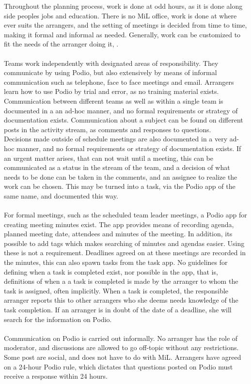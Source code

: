 Throughout the planning process, work is done at odd hours, as it is done along side peoples jobs and education. There is no MiL office, work is done at where ever suits the arrangers, and the setting of meetings is decided from time to time, making it formal and informal as needed. Generally, work can be customized to fit the needs of the arranger doing it, .
\\ \\
Teams work independently with designated areas of responsibility. They communicate by using Podio, but also extensively by means of informal communication such as telephone, face to face meetings and email. Arrangers learn how to use Podio by trial and error, as no training material exists. Communication between different teams as well as within a single team is documented in a an ad-hoc manner, and no formal requirements or strategy of documentation exists. Communication about a subject can be found on different posts in the activity stream, as comments and responses to questions. 
\\
Decisions made outside of schedule meetings are also documented in a very ad-hoc manner, and no formal requirements or strategy of documentation exists. If an urgent matter arises, that can not wait until a meeting, this can be communicated as a status in the stream of the team, and a decision of what needs to be done can be taken in the comments, and an assignee to realize the work can be chosen. This may be turned into a task, via the Podio app of the same name, and documented this way.
\\ \\
For formal meetings, such as the scheduled team leader meetings, a Podio app for creating meeting minutes exist. The app provides means of recording agenda, planned meeting date, attendees and minutes of the meeting. In addition, its possible to add tags which makes searching of minutes and agendas easier. Using these is not a requirement. Deadlines agreed on at these meetings are recorded in the minutes, this can also spawn tasks from the task app. No guidelines for defining when a task is completed exist, nor possible in the app, that is, definitions of when a a task is completed is made by the arranger to whom the task is assigned, often implicitly. When a task is completed, the responsible arranger reports this to other arrangers who she deems needs knowledge of the task completion. If an arranger is in doubt of the date of a deadline, she will search for the information on Podio.
\\ \\
Communication on Podio is carried out informally. No arranger has the role of moderator, and discussions are allowed to go off-topic without any restrictions. Some post are social, and does not have to do with MiL. Arrangers have agreed on a 24-hour Podio rule, which dictates that questions posted on Podio must receive a response within 24 hours.

